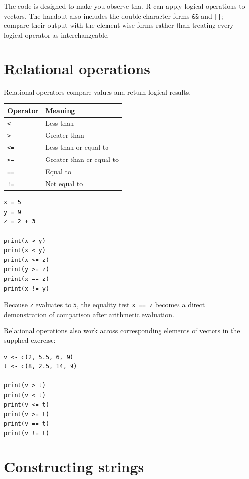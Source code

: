 \begin{keyidea}
The code is designed to make you observe that R can apply logical operations to vectors. The handout also includes the double-character forms \texttt{\&\&} and \texttt{||}; compare their output with the element-wise forms rather than treating every logical operator as interchangeable.
\end{keyidea}

\section{Relational operations}

Relational operators compare values and return logical results.

\begin{dstable}
\begin{tabularx}{\linewidth}{@{}p{2.4cm}X@{}}
\toprule
\rowcolor{DSPaleBlue!92}
Operator & Meaning \\
\midrule
\texttt{<} & Less than \\
\texttt{>} & Greater than \\
\texttt{<=} & Less than or equal to \\
\texttt{>=} & Greater than or equal to \\
\texttt{==} & Equal to \\
\texttt{!=} & Not equal to \\
\bottomrule
\end{tabularx}
\end{dstable}

\begin{lstlisting}[style=dsr]
x = 5
y = 9
z = 2 + 3

print(x > y)
print(x < y)
print(x <= z)
print(y >= z)
print(x == z)
print(x != y)
\end{lstlisting}

Because \texttt{z} evaluates to \texttt{5}, the equality test \texttt{x == z} becomes a direct demonstration of comparison after arithmetic evaluation.

Relational operations also work across corresponding elements of vectors in the supplied exercise:

\begin{lstlisting}[style=dsr]
v <- c(2, 5.5, 6, 9)
t <- c(8, 2.5, 14, 9)

print(v > t)
print(v < t)
print(v <= t)
print(v >= t)
print(v == t)
print(v != t)
\end{lstlisting}

\section{Constructing strings}

